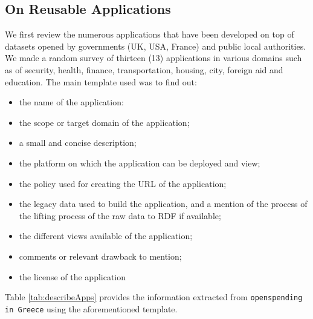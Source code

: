 \subsection{On Reusable Applications} \label{sec:reusable}
We first review the numerous applications that have been developed on top of datasets  opened by governments (UK, USA, France) and public local authorities. We made a random survey of thirteen (13) applications \cite{deliverable2012a} in various domains such as of security, health, finance, transportation, housing, city, foreign aid and education. The main template used was to find out:
\begin{itemize}
\item the name of the application:
\item the scope or target domain of the application;
\item a small and concise description;
\item the platform on which the application can be deployed and view;
\item the policy used for creating the URL of the application;
\item the legacy data used to build the application, and a mention of the process of the lifting process of the raw data to RDF if available;
\item the different views available of the application;
\item comments or relevant drawback to mention;
\item the license of the application
\end{itemize}
 Table \ref{tab:describeApps} provides the information extracted from \texttt{openspending in Greece} using the aforementioned template. 

